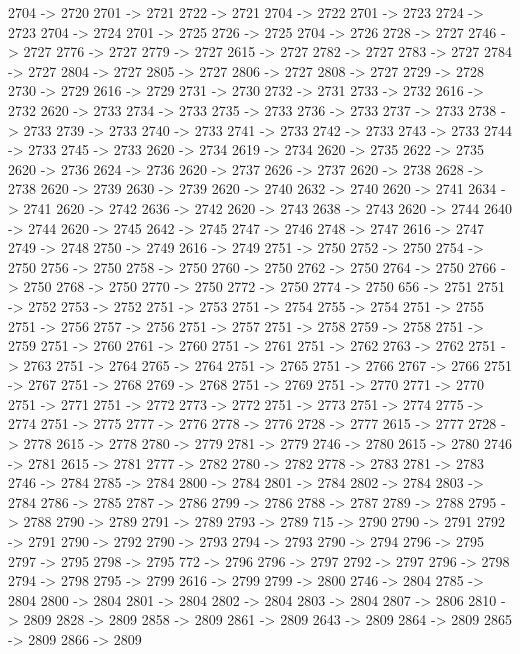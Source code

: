 {	2704 -> 2720
	2701 -> 2721
	2722 -> 2721
	2704 -> 2722
	2701 -> 2723
	2724 -> 2723
	2704 -> 2724
	2701 -> 2725
	2726 -> 2725
	2704 -> 2726
	2728 -> 2727
	2746 -> 2727
	2776 -> 2727
	2779 -> 2727
	2615 -> 2727
	2782 -> 2727
	2783 -> 2727
	2784 -> 2727
	2804 -> 2727
	2805 -> 2727
	2806 -> 2727
	2808 -> 2727
	2729 -> 2728
	2730 -> 2729
	2616 -> 2729
	2731 -> 2730
	2732 -> 2731
	2733 -> 2732
	2616 -> 2732
	2620 -> 2733
	2734 -> 2733
	2735 -> 2733
	2736 -> 2733
	2737 -> 2733
	2738 -> 2733
	2739 -> 2733
	2740 -> 2733
	2741 -> 2733
	2742 -> 2733
	2743 -> 2733
	2744 -> 2733
	2745 -> 2733
	2620 -> 2734
	2619 -> 2734
	2620 -> 2735
	2622 -> 2735
	2620 -> 2736
	2624 -> 2736
	2620 -> 2737
	2626 -> 2737
	2620 -> 2738
	2628 -> 2738
	2620 -> 2739
	2630 -> 2739
	2620 -> 2740
	2632 -> 2740
	2620 -> 2741
	2634 -> 2741
	2620 -> 2742
	2636 -> 2742
	2620 -> 2743
	2638 -> 2743
	2620 -> 2744
	2640 -> 2744
	2620 -> 2745
	2642 -> 2745
	2747 -> 2746
	2748 -> 2747
	2616 -> 2747
	2749 -> 2748
	2750 -> 2749
	2616 -> 2749
	2751 -> 2750
	2752 -> 2750
	2754 -> 2750
	2756 -> 2750
	2758 -> 2750
	2760 -> 2750
	2762 -> 2750
	2764 -> 2750
	2766 -> 2750
	2768 -> 2750
	2770 -> 2750
	2772 -> 2750
	2774 -> 2750
	656 -> 2751
	2751 -> 2752
	2753 -> 2752
	2751 -> 2753
	2751 -> 2754
	2755 -> 2754
	2751 -> 2755
	2751 -> 2756
	2757 -> 2756
	2751 -> 2757
	2751 -> 2758
	2759 -> 2758
	2751 -> 2759
	2751 -> 2760
	2761 -> 2760
	2751 -> 2761
	2751 -> 2762
	2763 -> 2762
	2751 -> 2763
	2751 -> 2764
	2765 -> 2764
	2751 -> 2765
	2751 -> 2766
	2767 -> 2766
	2751 -> 2767
	2751 -> 2768
	2769 -> 2768
	2751 -> 2769
	2751 -> 2770
	2771 -> 2770
	2751 -> 2771
	2751 -> 2772
	2773 -> 2772
	2751 -> 2773
	2751 -> 2774
	2775 -> 2774
	2751 -> 2775
	2777 -> 2776
	2778 -> 2776
	2728 -> 2777
	2615 -> 2777
	2728 -> 2778
	2615 -> 2778
	2780 -> 2779
	2781 -> 2779
	2746 -> 2780
	2615 -> 2780
	2746 -> 2781
	2615 -> 2781
	2777 -> 2782
	2780 -> 2782
	2778 -> 2783
	2781 -> 2783
	2746 -> 2784
	2785 -> 2784
	2800 -> 2784
	2801 -> 2784
	2802 -> 2784
	2803 -> 2784
	2786 -> 2785
	2787 -> 2786
	2799 -> 2786
	2788 -> 2787
	2789 -> 2788
	2795 -> 2788
	2790 -> 2789
	2791 -> 2789
	2793 -> 2789
	715 -> 2790
	2790 -> 2791
	2792 -> 2791
	2790 -> 2792
	2790 -> 2793
	2794 -> 2793
	2790 -> 2794
	2796 -> 2795
	2797 -> 2795
	2798 -> 2795
	772 -> 2796
	2796 -> 2797
	2792 -> 2797
	2796 -> 2798
	2794 -> 2798
	2795 -> 2799
	2616 -> 2799
	2799 -> 2800
	2746 -> 2804
	2785 -> 2804
	2800 -> 2804
	2801 -> 2804
	2802 -> 2804
	2803 -> 2804
	2807 -> 2806
	2810 -> 2809
	2828 -> 2809
	2858 -> 2809
	2861 -> 2809
	2643 -> 2809
	2864 -> 2809
	2865 -> 2809
	2866 -> 2809
}
